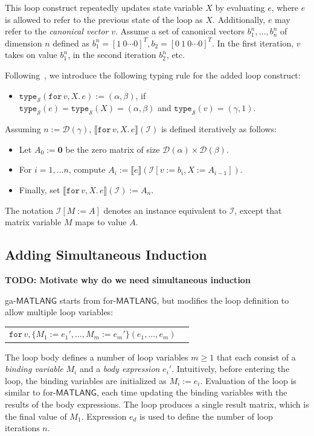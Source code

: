 \documentclass{article}
\newcommand{\ML}{\mathsf{MATLANG}}
\newcommand{\transp}[1]{#1^T}
\newcommand{\ffor}[3]{\texttt{for}\, #1,#2 \texttt{.}\, #3}
\newcommand{\I}{\mathcal{I}}
\newcommand{\Sch}{\mathcal{S}}
\newcommand{\ttypes}{\texttt{type}_{\Sch}}
\newcommand{\dom}{\mathcal{D}}
\newcommand{\sem}[2]{\llbracket #1 \rrbracket(#2)}
\begin{document}
\noindent
This loop construct repeatedly updates state variable $X$ by evaluating $e$, where $e$ is allowed to refer to the previous state of the loop as $X$.
Additionally, $e$ may refer to the \emph{canonical vector} $v$.
Assume a set of canonical vectors $b_1^n,\ldots,b_n^n$ of dimension $n$ defined as $b_1^n = \transp{[1\ 0 \cdots 0]},b_2 = [0\ 1\ 0 \cdots 0]^T$.
In the first iteration, $v$ takes on value $b_1^n$, in the second iteration $b_2^n$, etc.

Following~\cite{geerts_expressive_2021}, we introduce the following typing rule for the added loop construct:

\begin{itemize}
    \item $\ttypes(\ffor{v}{X}{e}) := (\alpha,\beta)$, if \\
          $\ttypes(e)=\ttypes(X) =(\alpha,\beta)$ and $\ttypes(v) = (\gamma,1)$.
\end{itemize}

Assuming $n := \dom(\gamma)$, $\sem{\ffor{v}{X}{e}}{\I}$ is defined iteratively as follows:
\begin{itemize}
    \item Let $A_0 := \mathbf{0}$ be the zero matrix of size $\dom(\alpha)\times \dom(\beta)$.
    \item For $i=1,\ldots n$, compute $A_i:= \sem{e}{\I[v := b_i, X:= A_{i-1}]}$.
    \item Finally, set $\sem{\ffor{v}{X}{e}}{\I}:= A_{n}$.
\end{itemize}

The notation $\I[M := A]$ denotes an instance equivalent to $\I$, except that matrix variable $M$ maps to value $A$.

\subsection{Adding Simultaneous Induction}
\textbf{TODO: Motivate why do we need simultaneous induction}

ga-$\ML$ starts from for-$\ML$, but modifies the loop definition to allow multiple loop variables:

\medskip
\begin{tabular}{lc}
    $\texttt{for}\, v,\{ M_1 := e_1', \ldots, M_m := e_m' \}(e_1, \ldots, e_m)$
\end{tabular}
\medskip

The loop body defines a number of loop variables $m \geq 1$ that each consist of a \emph{binding variable} $M_i$ and a \emph{body expression} $e_i'$.
Intuitively, before entering the loop, the binding variables are initialized as $M_i := e_i$.
Evaluation of the loop is similar to for-$\ML$, each time updating the binding variables with the results of the body expressions.
The loop produces a single result matrix, which is the final value of $M_1$.
Expression $e_d$ is used to define the number of loop iterations $n$.
\end{document}
